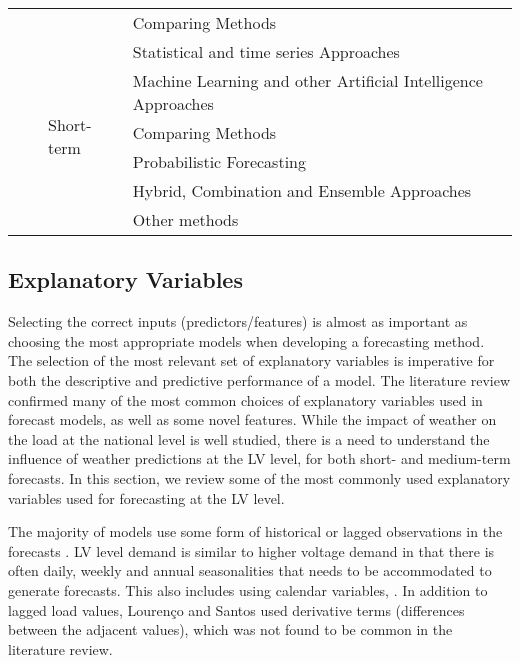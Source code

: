 \begin{table}[]
\begin{tabular}{p{.06\linewidth}p{.08\linewidth}p{.08\linewidth}p{.46\linewidth}p{.29\linewidth}}
		&  &  & Comparing Methods & \cite{Humeau2013elf} \\
		&  & \multirow{6}{*}{Short-term} & Statistical and time series Approaches & \cite{macmackin2019mad, dinesh2020rpf, Marinescu2013RED} \\
		&  &  & Machine Learning and other Artificial   Intelligence Approaches & \cite{moon2019aca, chen2019daa, sun2019ubd, wu2020ast, Elvers2019spl, voss2018residential, sousa2014slf, voss2018adjusted, konjic2005fis} \\
		&  &  & Comparing Methods & \cite{garulli2015mat, Humeau2013elf} \\
		&  &  & Probabilistic Forecasting & \cite{Taieb2020hpf, taieb2016fui} \\
		&  &  & Hybrid, Combination and Ensemble   Approaches & \cite{Laurinec2019due, Amato2021fhr, taieb2016fui} \\
		&  &  & Other methods & \cite{zhou2019pse} \\ \bottomrule
	\end{tabular}
\end{table}


\subsection{Explanatory Variables}
\label{subsec:expl_var}
Selecting the correct inputs (predictors/features) is almost as important as choosing the most appropriate models when developing a forecasting method. The selection of the most relevant set of explanatory variables is imperative for both the descriptive and predictive performance of a model. The literature review confirmed many of the most common choices of explanatory variables used in forecast models, as well as some novel features. While the impact of weather on the load at the national level is well studied, there is a need to understand the influence of weather predictions at the LV level, for both short- and medium-term forecasts. In this section, we review some of the most commonly used explanatory variables used for forecasting at the LV level.

The majority of models use some form of historical or lagged observations in the forecasts \cite{sousa2012atr, gajowniczek2014ste, Yunusov2018sss, jurado2017fir}. LV level demand is similar to higher voltage demand in that there is often daily, weekly and annual seasonalities that needs to be accommodated to generate forecasts. This also includes using calendar variables, \cite{Cerquitelli2019esm,ahmad2019dlf,moon2019aca, sousa2012atr}. In addition to lagged load values, Louren{\c{c}}o and Santos \cite{lourenco2012stl} used derivative terms (differences between the adjacent values), which was not found to be common in the literature review. 

